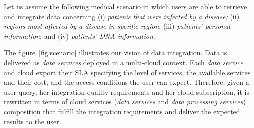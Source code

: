Let us assume the following medical scenario in which users are able to retrieve and integrate data concerning (i) \textit{patients that were infected by a disease;}
(ii) \textit{regions most affected by a disease in specific region}; (iii)
\textit{patients' personal information}; and (iv) \textit{patients' DNA
information}.

The figure~\ref{fig:scenario} illustrates our vision of data integration. Data is delivered as \textit{data services} deployed in a multi-cloud context. Each \textit{data service} and cloud export their SLA specifying the level of services, the available services and their cost, and the access conditions the user can expect. Therefore, given a user query, her integration quality requirements and her cloud subscription, it is rewritten in terms of cloud services (\textit{data services} and \textit{data processing services}) composition that fulfill the integration requirements and deliver the expected results to the user.

